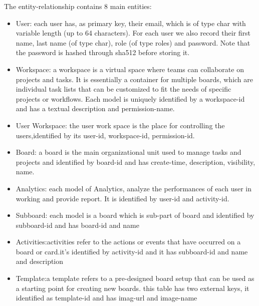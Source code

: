 \noindent The entity-relationship contains 8 main entities:
\begin{itemize}
    \item User: each user has, as primary key, their email, which is of type char with variable length (up to 64 characters). For each user we also record their first name, last name (of type char), role (of type roles) and password. Note that the password is hashed through sha512 before storing it.
    \item Workspace: a workspace is a virtual space where teams can collaborate on projects and tasks. It is essentially a container for multiple boards, which are individual task lists that can be customized to fit the needs of specific projects or workflows. Each model is uniquely identified by a workspace-id and has a textual description and permission-name.
    \item User Workspace: the user work space is the place for controlling the users,identified by its user-id, workspace-id, permission-id.
    \item Board: a board is the main organizational unit used to manage tasks and projects and identified by board-id and has create-time, description, visibility, name.
    \item Analytics: each model of Analytics, analyze the performances of each user in working and provide report. It is identified by user-id and activity-id.
    \item Subboard: each model is a board which is sub-part of board and identified by subboard-id and has board-id and name 
    \item Activities:activities refer to the actions or events that have occurred on a board or card.it's identified by activity-id and it has subboard-id and name and description
    \item Template:a template refers to a pre-designed board setup that can be used as a starting point for creating new boards. this table has two external keys, it identified as template-id and has imag-url and image-name
\end{itemize}
